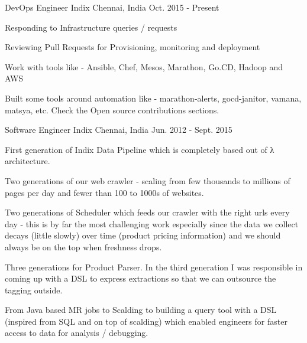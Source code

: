

\begin{cventries}

  \cventry
    {DevOps Engineer} %
    {Indix} %
    {Chennai, India} %
    {Oct. 2015 - Present} %
    {
      \begin{cvitems} %
        \item {Responding to Infrastructure queries / requests}
        \item {Reviewing Pull Requests for Provisioning, monitoring and deployment}
        \item {Work with tools like - Ansible, Chef, Mesos, Marathon, Go.CD, Hadoop and AWS}
        \item {Built some tools around automation like - marathon-alerts, gocd-janitor, vamana, matsya, etc.
        Check the Open source contributions sections. }
      \end{cvitems}
    }

  \cventry
    {Software Engineer} %
    {Indix} %
    {Chennai, India} %
    {Jun. 2012 - Sept. 2015} %
    {
      \begin{cvitems} %
        \item {First generation of Indix Data Pipeline which is completely based out of λ architecture. }
        \item {Two generations of our web crawler - scaling from few thousands to millions of pages per day and fewer than 100 to 1000s of websites. }
        \item {Two generations of Scheduler which feeds our crawler with the right urls every day - this is by far the most challenging work especially since the data we collect decays (little slowly) over time (product pricing information) and
        we should always be on the top when freshness drops. }
        \item {Three generations for Product Parser. In the third generation I was responsible in coming up with a DSL to express extractions so that we can outsource the tagging outside.}
        \item {From Java based MR jobs to Scalding to building a query tool with a DSL (inspired from SQL and on top of scalding) which enabled engineers for faster access to data for analysis / debugging.}
      \end{cvitems}
    }


\end{cventries}
